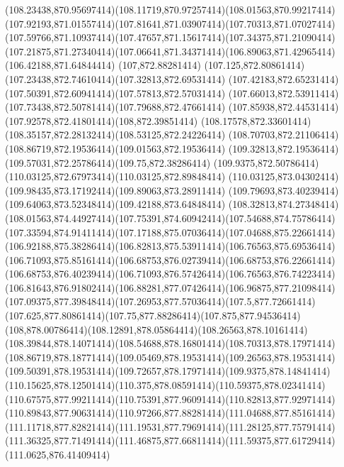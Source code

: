 {{	\curveto(108.23438,870.95697414)(108.11719,870.97257414)(108.01563,870.99217414)
	\curveto(107.92193,871.01557414)(107.81641,871.03907414)(107.70313,871.07027414)
	\curveto(107.59766,871.10937414)(107.47657,871.15617414)(107.34375,871.21090414)
	\curveto(107.21875,871.27340414)(107.06641,871.34371414)(106.89063,871.42965414)
	\lineto(106.42188,871.64844414)
	\lineto(107,872.88281414)
	\curveto(107.125,872.80861414)(107.23438,872.74610414)(107.32813,872.69531414)
	\curveto(107.42183,872.65231414)(107.50391,872.60941414)(107.57813,872.57031414)
	\curveto(107.66013,872.53911414)(107.73438,872.50781414)(107.79688,872.47661414)
	\curveto(107.85938,872.44531414)(107.92578,872.41801414)(108,872.39851414)
	\curveto(108.17578,872.33601414)(108.35157,872.28132414)(108.53125,872.24226414)
	\curveto(108.70703,872.21106414)(108.86719,872.19536414)(109.01563,872.19536414)
	\curveto(109.32813,872.19536414)(109.57031,872.25786414)(109.75,872.38286414)
	\curveto(109.9375,872.50786414)(110.03125,872.67973414)(110.03125,872.89848414)
	\curveto(110.03125,873.04302414)(109.98435,873.17192414)(109.89063,873.28911414)
	\curveto(109.79693,873.40239414)(109.64063,873.52348414)(109.42188,873.64848414)
	\lineto(108.32813,874.27348414)
	\curveto(108.01563,874.44927414)(107.75391,874.60942414)(107.54688,874.75786414)
	\curveto(107.33594,874.91411414)(107.17188,875.07036414)(107.04688,875.22661414)
	\curveto(106.92188,875.38286414)(106.82813,875.53911414)(106.76563,875.69536414)
	\curveto(106.71093,875.85161414)(106.68753,876.02739414)(106.68753,876.22661414)
	\curveto(106.68753,876.40239414)(106.71093,876.57426414)(106.76563,876.74223414)
	\curveto(106.81643,876.91802414)(106.88281,877.07426414)(106.96875,877.21098414)
	\curveto(107.09375,877.39848414)(107.26953,877.57036414)(107.5,877.72661414)
	\curveto(107.625,877.80861414)(107.75,877.88286414)(107.875,877.94536414)
	\curveto(108,878.00786414)(108.12891,878.05864414)(108.26563,878.10161414)
	\curveto(108.39844,878.14071414)(108.54688,878.16801414)(108.70313,878.17971414)
	\curveto(108.86719,878.18771414)(109.05469,878.19531414)(109.26563,878.19531414)
	\curveto(109.50391,878.19531414)(109.72657,878.17971414)(109.9375,878.14841414)
	\curveto(110.15625,878.12501414)(110.375,878.08591414)(110.59375,878.02341414)
	\curveto(110.67575,877.99211414)(110.75391,877.96091414)(110.82813,877.92971414)
	\curveto(110.89843,877.90631414)(110.97266,877.88281414)(111.04688,877.85161414)
	\curveto(111.11718,877.82821414)(111.19531,877.79691414)(111.28125,877.75791414)
	\curveto(111.36325,877.71491414)(111.46875,877.66811414)(111.59375,877.61729414)
	\closepath
	\moveto(111.0625,876.41409414)
}
}

